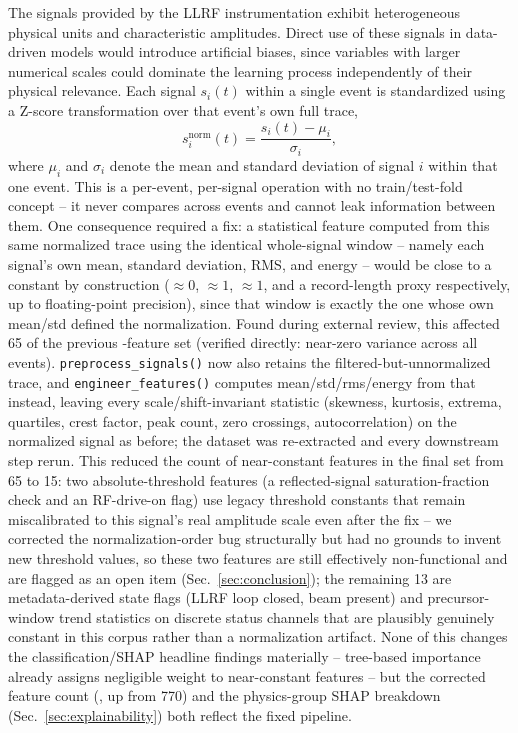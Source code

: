 The signals provided by the LLRF instrumentation exhibit heterogeneous physical units and characteristic amplitudes. Direct use of these signals in data-driven models would introduce artificial biases, since variables with larger numerical scales could dominate the learning process independently of their physical relevance. Each signal $s_i(t)$ within a single event is standardized using a Z-score transformation over that event's own full trace,
\begin{equation}
s_i^{\mathrm{norm}}(t) = \frac{s_i(t) - \mu_i}{\sigma_i},
\end{equation}
where $\mu_i$ and $\sigma_i$ denote the mean and standard deviation of signal $i$ within that one event. This is a per-event, per-signal operation with no train/test-fold concept -- it never compares across events and cannot leak information between them. One consequence required a fix: a statistical feature computed from this same normalized trace using the identical whole-signal window -- namely each signal's own mean, standard deviation, RMS, and energy -- would be close to a constant by construction ($\approx 0$, $\approx 1$, $\approx 1$, and a record-length proxy respectively, up to floating-point precision), since that window is exactly the one whose own mean/std defined the normalization. Found during external review, this affected 65 of the previous \MetricZeroSixBinaryClassificationNFeatures{}-feature set (verified directly: near-zero variance across all \MetricZeroZeroDataAttritionChainVSixTotalEvents{} events). \texttt{preprocess\_signals()} now also retains the filtered-but-unnormalized trace, and \texttt{engineer\_features()} computes mean/std/rms/energy from that instead, leaving every scale/shift-invariant statistic (skewness, kurtosis, extrema, quartiles, crest factor, peak count, zero crossings, autocorrelation) on the normalized signal as before; the dataset was re-extracted and every downstream step rerun. This reduced the count of near-constant features in the final set from 65 to 15: two absolute-threshold features (a reflected-signal saturation-fraction check and an RF-drive-on flag) use legacy threshold constants that remain miscalibrated to this signal's real amplitude scale even after the fix -- we corrected the normalization-order bug structurally but had no grounds to invent new threshold values, so these two features are still effectively non-functional and are flagged as an open item (Sec.~\ref{sec:conclusion}); the remaining 13 are metadata-derived state flags (LLRF loop closed, beam present) and precursor-window trend statistics on discrete status channels that are plausibly genuinely constant in this corpus rather than a normalization artifact. None of this changes the classification/SHAP headline findings materially -- tree-based importance already assigns negligible weight to near-constant features -- but the corrected feature count (\MetricZeroSixBinaryClassificationNFeatures{}, up from 770) and the physics-group SHAP breakdown (Sec.~\ref{sec:explainability}) both reflect the fixed pipeline. %

